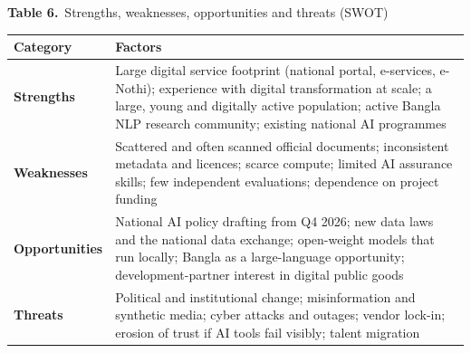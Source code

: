 \documentclass[border=10pt]{standalone}
\begin{document}
\begin{minipage}{17cm}
{\large\bfseries Table 6.}\ {\large Strengths, weaknesses, opportunities and threats (SWOT)}\par\vspace{7pt}
\small
{}
\begin{tabularx}{\linewidth}{@{}>{\hsize=0.377\hsize\raggedright\arraybackslash}X>{\hsize=1.623\hsize\raggedright\arraybackslash}X@{}}
\arrayrulecolor{bapilrule}\toprule
\rowcolor{white}\textbf{Category} & \textbf{Factors} \\
\midrule
\textbf{Strengths} & Large digital service footprint (national portal, e-services, e-Nothi); experience with digital transformation at scale; a large, young and digitally active population; active Bangla NLP research community; existing national AI programmes \\
\textbf{Weaknesses} & Scattered and often scanned official documents; inconsistent metadata and licences; scarce compute; limited AI assurance skills; few independent evaluations; dependence on project funding \\
\textbf{Opportunities} & National AI policy drafting from Q4 2026; new data laws and the national data exchange; open-weight models that run locally; Bangla as a large-language opportunity; development-partner interest in digital public goods \\
\textbf{Threats} & Political and institutional change; misinformation and synthetic media; cyber attacks and outages; vendor lock-in; erosion of trust if AI tools fail visibly; talent migration \\
\bottomrule
\end{tabularx}
\par{}
\end{minipage}
\end{document}
